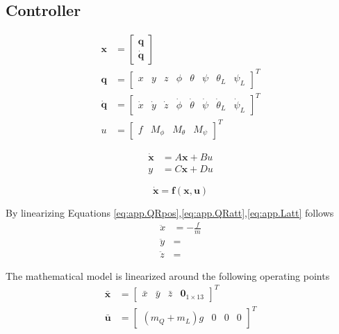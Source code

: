 \subsection{Controller}
\begin{align}\label{eq:state}
\textbf{x}&=\begin{bmatrix}
\textbf{q}\\
\mathbf{\dot{q}}
\end{bmatrix}\\
\mathbf{q}&=\begin{bmatrix}
x&y&z&\phi&\theta&\psi&\theta_L&\psi_L
\end{bmatrix}^T\\
\mathbf{\dot{q}}&=\begin{bmatrix}
\dot{x}&\dot{y}&\dot{z}&\dot{\phi}&\dot{\theta}&\dot{\psi}&\dot{\theta}_L&\dot{\psi}_L
\end{bmatrix}^T\\
u&=\begin{bmatrix}
f&M_\phi&M_\theta&M_\psi
\end{bmatrix}^T
\end{align}

\begin{align}\label{eq:ss}
\mathbf{\dot{x} }&=A\mathbf{x}+Bu\\
y&=C\mathbf{x}+Du
\end{align}

\begin{equation}\label{key}
\mathbf{\dot{x}}=\textbf{f}(\mathbf{x,u})
\end{equation}

By linearizing Equations \ref{eq:app.QRpos},\ref{eq:app.QRatt},\ref{eq:app.Latt} follows
\begin{align}\label{key}
\ddot{x}&=-\frac{f}{m}\\
\ddot{y}&=\\
\ddot{z}&=
\end{align}

The mathematical model is linearized around the following operating points
\begin{align}\label{key}
\bar{\mathbf{x}}&=\begin{bmatrix}\bar{x}&\bar{y}&\bar{z}&\textbf{0}_{1\times13}\end{bmatrix}^T\\
\bar{\textbf{u}}&=\begin{bmatrix}
(m_Q+m_L)g&0&0&0
\end{bmatrix}^T
\end{align}

